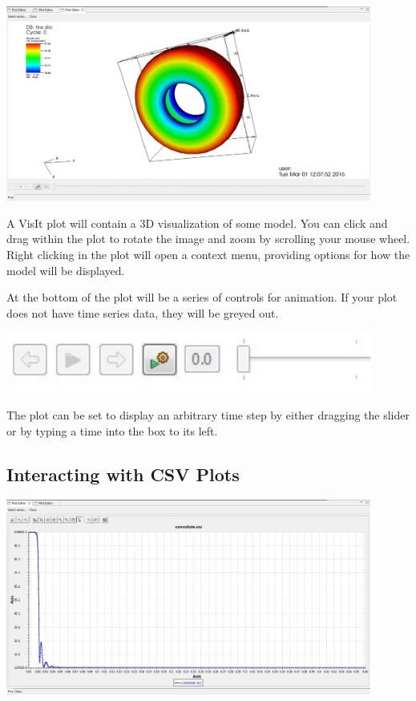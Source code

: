 \documentclass{article}
\begin{document}
\begin{center}
\includegraphics[width=12cm]{images/VisItPlot}
\end{center}

A VisIt plot will contain a 3D visualization of some model. You can click and
drag within the plot to rotate the image and zoom by scrolling your mouse wheel.
Right clicking in the plot will open a context menu, providing options for how
the model will be displayed.

At the bottom of the plot will be a series of controls for animation. If your
plot does not have time series data, they will be greyed out. 

\begin{center}
\includegraphics[width=12cm]{images/TimeSliderWidget} 
\end{center}

The plot can be set to display an arbitrary time step by either dragging the
slider or by typing a time into the box to its left.

\subsection{Interacting with CSV Plots}

\begin{center}
\includegraphics[width=12cm]{images/CSVGraph}
\end{center}
\end{document}

